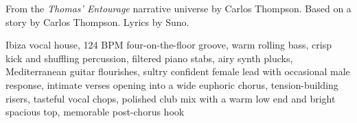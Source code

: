 
\begin{notes}
From the \emph{Thomas’ Entourage} narrative universe by Carlos Thompson. Based on a story by Carlos Thompson. Lyrics by Suno.
\end{notes}
\begin{style}
Ibiza vocal house, 124 BPM four-on-the-floor groove, warm rolling bass, crisp kick and shuffling percussion, filtered piano stabs, airy synth plucks, Mediterranean guitar flourishes, sultry confident female lead with occasional male response, intimate verses opening into a wide euphoric chorus, tension-building risers, tasteful vocal chops, polished club mix with a warm low end and bright spacious top, memorable post-chorus hook
\end{style}
